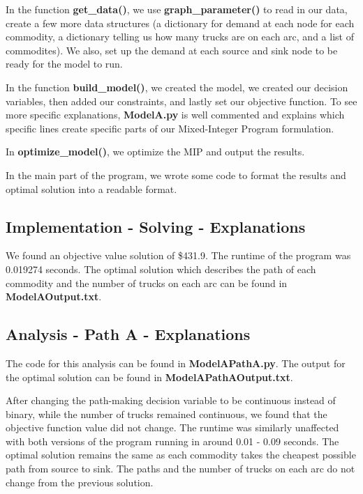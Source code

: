\documentclass[
]{article}
\begin{document}
In the function \textbf{get\_data()}, we use \textbf{graph\_parameter()}
to read in our data, create a few more data structures (a dictionary for
demand at each node for each commodity, a dictionary telling us how many
trucks are on each arc, and a list of commodites). We also, set up the
demand at each source and sink node to be ready for the model to run.

In the function \textbf{build\_model()}, we created the model, we
created our decision variables, then added our constraints, and lastly
set our objective function. To see more specific explanations,
\textbf{ModelA.py} is well commented and explains which specific lines
create specific parts of our Mixed-Integer Program formulation.

In \textbf{optimize\_model()}, we optimize the MIP and output the
results.

In the main part of the program, we wrote some code to format the
results and optimal solution into a readable format.

\hypertarget{implementation---solving---explanations}{%
\subsection{Implementation - Solving -
Explanations}\label{implementation---solving---explanations}}

We found an objective value solution of \$431.9. The runtime of the
program was 0.019274 seconds. The optimal solution which describes the
path of each commodity and the number of trucks on each arc can be found
in \textbf{ModelAOutput.txt}.

\hypertarget{analysis---path-a---explanations}{%
\subsection{Analysis - Path A -
Explanations}\label{analysis---path-a---explanations}}

The code for this analysis can be found in \textbf{ModelAPathA.py}. The
output for the optimal solution can be found in
\textbf{ModelAPathAOutput.txt}.

After changing the path-making decision variable to be continuous
instead of binary, while the number of trucks remained continuous, we
found that the objective function value did not change. The runtime was
similarly unaffected with both versions of the program running in around
0.01 - 0.09 seconds. The optimal solution remains the same as each
commodity takes the cheapest possible path from source to sink. The
paths and the number of trucks on each arc do not change from the
previous solution.
\end{document}
